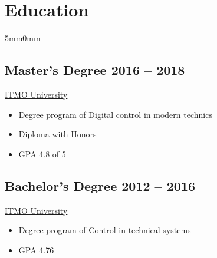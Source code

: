 \documentclass[10pt]{article}
\newcommand{\lmvalue}{5mm}
\newcommand{\rmvalue}{0mm}
\begin{document}
    \section*{Education}
    \begin{changemargin}{\lmvalue}{\rmvalue}

        \begin{minipage}[t]{0.52\linewidth}
            \subsection*{Master's Degree \hfill {\color{gray}2016 – 2018}}
            \href{https://en.itmo.ru/}{ITMO University}
            \begin{itemize}
                \item Degree program of Digital control in modern technics
                \item Diploma with Honors
                \item GPA 4.8 of 5
            \end{itemize}
        \end{minipage}
        \hfill%
        \begin{minipage}[t]{0.42\linewidth}
            \subsection*{Bachelor's Degree \hfill {\color{gray}2012 – 2016}}
            \href{https://en.itmo.ru/}{ITMO University}
            \begin{itemize}
                \item Degree program of Control in technical systems
                \item GPA 4.76
            \end{itemize}
        \end{minipage}
    \end{changemargin}
\end{document}
